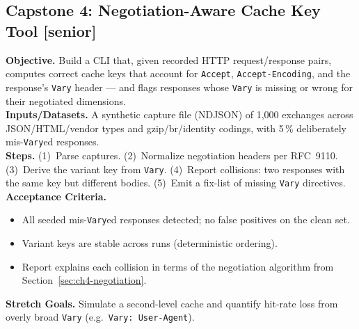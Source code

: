 \subsection{Capstone 4: Negotiation-Aware Cache Key Tool [senior]}
\textbf{Objective.} Build a CLI that, given recorded HTTP request/response pairs,
computes correct cache keys that account for \texttt{Accept},
\texttt{Accept-Encoding}, and the response's \texttt{Vary} header --- and flags
responses whose \texttt{Vary} is missing or wrong for their negotiated
dimensions.\\
\textbf{Inputs/Datasets.} A synthetic capture file (NDJSON) of 1{,}000 exchanges
across JSON/HTML/vendor types and gzip/br/identity codings, with 5\,\% deliberately
mis-\texttt{Vary}ed responses.\\
\textbf{Steps.} (1)~Parse captures. (2)~Normalize negotiation headers per
RFC~9110. (3)~Derive the variant key from \texttt{Vary}. (4)~Report collisions:
two responses with the same key but different bodies. (5)~Emit a fix-list of
missing \texttt{Vary} directives.\\
\textbf{Acceptance Criteria.}
\begin{itemize}
  \item[$\square$] All seeded mis-\texttt{Vary}ed responses detected; no false
        positives on the clean set.
  \item[$\square$] Variant keys are stable across runs (deterministic ordering).
  \item[$\square$] Report explains each collision in terms of the negotiation
        algorithm from Section~\ref{sec:ch4-negotiation}.
\end{itemize}
\textbf{Stretch Goals.} Simulate a second-level cache and quantify hit-rate loss
from overly broad \texttt{Vary} (e.g.\ \texttt{Vary: User-Agent}).

